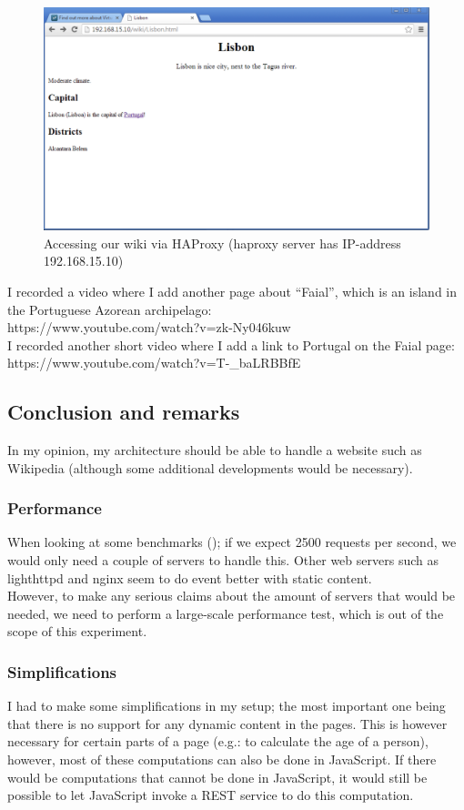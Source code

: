 \documentclass[12pt]{report}
\begin{document}
\begin{figure}[h!]
  \caption{Accessing our wiki via HAProxy (haproxy server has
    IP-address 192.168.15.10)}
  \label{fig:wikipedia_clone_1}
  \centering
    \includegraphics[scale=0.2]{pics/wikipedia_clone_1.png}
\end{figure}

I recorded a video where I add another page about ``Faial'', which is
an island in the Portuguese Azorean archipelago:\\
https://www.youtube.com/watch?v=zk-Ny046kuw
\\
I recorded another short video where I add a link to Portugal on the
Faial page:
https://www.youtube.com/watch?v=T-\_baLRBBfE


\subsection{Conclusion and remarks}
In my opinion, my architecture should be able to handle a website such as
Wikipedia (although some additional developments would be
necessary). 
\subsubsection{Performance}
When looking at some benchmarks
(\cite{web_server_benchmarks}); if we expect 2500 requests per second,
we would only need a couple of servers to handle this. Other web
servers such as lighthttpd and nginx seem to do event better with
static content. \\
However, to make any serious claims about the amount of servers that
would be needed, we need to perform a large-scale performance test,
which is out of the scope of this experiment.
\subsubsection{Simplifications}
I had to make some simplifications in my setup; the most important one
being that there is no support for any dynamic content in the pages. This
is however necessary for certain parts of a page (e.g.: to
calculate the age of a person), however, most of these computations
can also be done in JavaScript. If there would be computations that
cannot be done in JavaScript, it would still be possible to let
JavaScript invoke a REST service to do this computation.   
\end{document}
